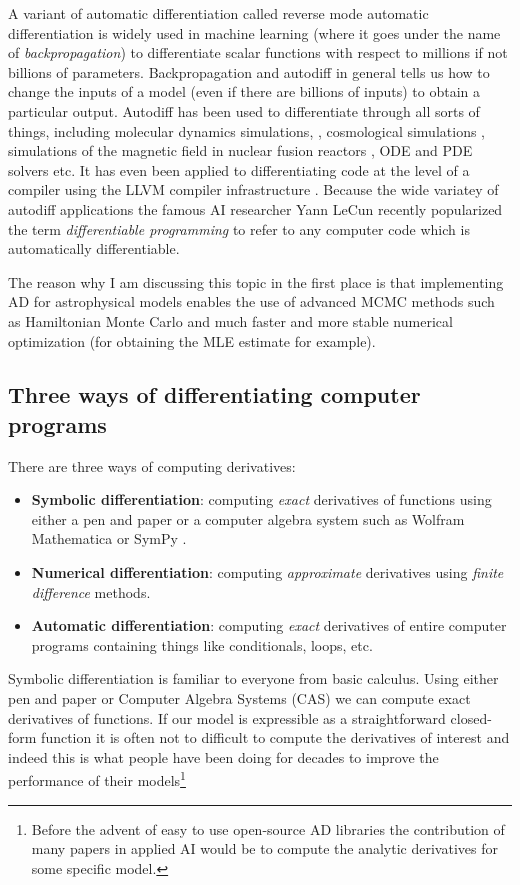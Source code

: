 \documentclass[12pt,dvipsnames]{report}
\newcommand{\ssf}[1]{\textsf{#1}}
\begin{document}
A variant of automatic differentiation called reverse mode automatic differentiation 
is widely used in machine learning (where it goes under the name of 
\emph{backpropagation}) to differentiate scalar functions with respect to 
millions if not billions of parameters. 
Backpropagation and autodiff in general tells us how to change the inputs of a 
model (even if there are billions of inputs) to obtain a particular output.
Autodiff has been used to differentiate through all sorts of things, including 
molecular dynamics simulations, \citep{arXiv:1912.04232}, cosmological simulations 
\citep{2016MNRAS.463.2273F}, simulations of the magnetic field in nuclear fusion 
reactors \citep{arXiv:2009.00196}, ODE and PDE solvers etc. It has even been 
applied to differentiating code at 
 the level of a compiler using the LLVM compiler infrastructure \citep{arXiv:2010.01709}.
 Because the wide variatey of autodiff applications
the famous AI researcher Yann LeCun recently popularized the term 
\textsl{differentiable programming} to refer to any computer code which is 
automatically differentiable.

The reason why I am discussing this topic in the first place is that implementing AD 
for astrophysical models enables the use  of advanced MCMC methods such as 
Hamiltonian Monte Carlo and much faster and more stable numerical optimization  
(for obtaining the MLE estimate for example).

\subsection{Three ways of differentiating computer programs}
There are three ways of computing derivatives:
\begin{itemize}
    \item \textbf{Symbolic differentiation}: computing \emph{exact} derivatives of 
    functions using either a pen and paper or a computer algebra system such as 
    \ssf{Wolfram Mathematica} or \ssf{SymPy} \citep{10.7717/peerj-cs.103}.
    \item \textbf{Numerical differentiation}: computing \emph{approximate} derivatives 
    using \textsl{finite difference}  methods.
    \item \textbf{Automatic differentiation}: computing \emph{exact} derivatives of entire 
    computer programs containing things like conditionals, loops, etc.
\end{itemize}
Symbolic differentiation is familiar to everyone from basic calculus. Using either 
pen and paper  or Computer Algebra Systems (CAS) we can compute exact 
derivatives of functions. 
If our model is expressible as a straightforward closed-form function it is 
often not to difficult to compute the derivatives of interest and indeed this 
is what people have been doing for decades to improve the performance of their
models\footnote{Before the advent of easy to use open-source AD libraries 
the contribution of many papers in applied AI would be to compute the analytic 
derivatives for some specific model.}
\end{document}
